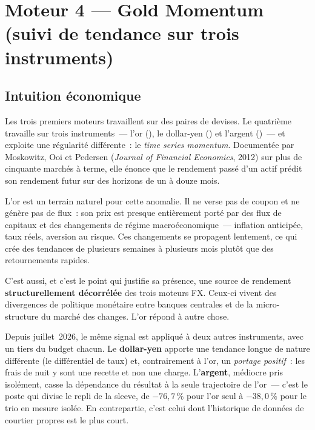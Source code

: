\documentclass[11pt, a4paper]{scrartcl}
\begin{document}
\section{Moteur 4 --- Gold Momentum (suivi de tendance sur trois instruments)}
\label{sec:gold}

\subsection{Intuition économique}

Les trois premiers moteurs travaillent sur des paires de devises. Le quatrième
travaille sur trois instruments~--- l'or (), le dollar-yen
() et l'argent ()~--- et exploite une régularité
différente~: le
\emph{time series momentum}. Documentée par Moskowitz, Ooi et Pedersen
(\emph{Journal of Financial Economics}, 2012) sur plus de cinquante marchés à
terme, elle énonce que le rendement passé d'un actif prédit son rendement futur
sur des horizons de un à douze mois.

L'or est un terrain naturel pour cette anomalie. Il ne verse pas de coupon et ne
génère pas de flux~: son prix est presque entièrement porté par des flux de
capitaux et des changements de régime macroéconomique~--- inflation anticipée,
taux réels, aversion au risque. Ces changements se propagent lentement, ce qui
crée des tendances de plusieurs semaines à plusieurs mois plutôt que des
retournements rapides.

C'est aussi, et c'est le point qui justifie sa présence, une source de rendement
\textbf{structurellement décorrélée} des trois moteurs FX. Ceux-ci vivent des
divergences de politique monétaire entre banques centrales et de la
micro-structure du marché des changes. L'or répond à autre chose.

\smallskip
Depuis juillet~2026, le même signal est appliqué à deux autres instruments, avec
un tiers du budget chacun. Le \textbf{dollar-yen} apporte une tendance longue de
nature différente (le différentiel de taux) et, contrairement à l'or, un
\emph{portage positif}~: les frais de nuit y sont une recette et non une charge.
L'\textbf{argent}, médiocre pris isolément, casse la dépendance du résultat à la
seule trajectoire de l'or~--- c'est le poste qui divise le repli de la sleeve, de
$-76{,}7\,\%$ pour l'or seul à $-38{,}0\,\%$ pour le trio en mesure isolée. En
contrepartie, c'est celui dont l'historique de données de courtier propres est le
plus court.
\end{document}
